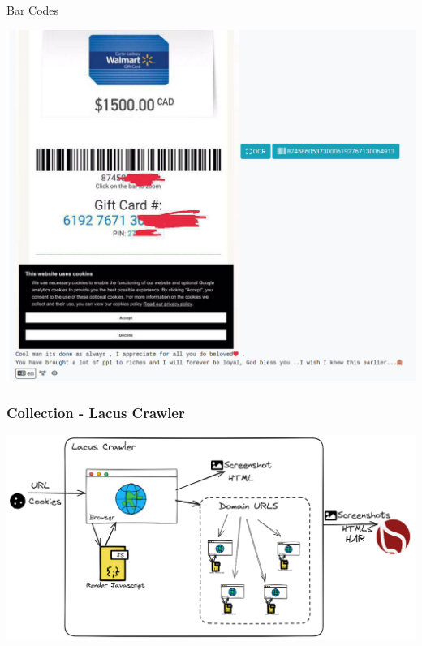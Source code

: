 \documentclass[aspectratio=169]{beamer}
\begin{document}
\begin{frame}[fragile]{Bar Codes}
    \begin{center}
        \includegraphics[scale=0.22]{screenshot/barcode.png}
    \end{center}
\end{frame}

\begin{frame}
    \frametitle{Collection - Lacus Crawler}
    \centerline{
        \includegraphics[scale=0.28]{images/ail-lacus.png}
    }
\end{frame}
\end{document}

